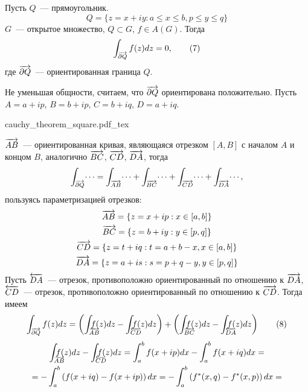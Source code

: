 \documentclass[main]{subfiles}
\begin{document}
\begin{theorem}\label{2:cauchy_square}
    Пусть $Q$~--- прямоугольник.
    \[Q = \{z = x + iy: a \le x \le b, p \le y \le q\}\]
    $G$~--- открытое множество, $Q \subset G$, $f \in A(G)$.
    Тогда
    \[\AnClOrInt[\AnClOrCurve[\partial Q]] f(z) dz = 0, \tag{7}\]
    где $\AnClOrCurve[\partial Q]$~--- ориентированная граница $Q$.
\end{theorem}
\begin{longProof}
    Не уменьшая общности, считаем, что $\AnClOrCurve[\partial Q]$ ориентирована положительно.
    Пусть $A = a + ip$, $B = b + ip$, $C = b + iq$, $D = a + iq$.
    \begin{center}
        {cauchy_theorem_square.pdf_tex}
    \end{center}
    $\AnClOrCurve[AB]$~--- ориентированная кривая, являющаяся отрезком $[A, B]$ с началом $A$ и концом $B$, аналогично $\AnClOrCurve[BC]$, $\AnClOrCurve[CD]$, $\AnClOrCurve[DA]$, тогда
    \[\AnClOrInt[\AnClOrCurve[\partial Q]] \dotsi = \AnClOrInt[\AnClOrCurve[AB]] \dotsi + \AnClOrInt[\AnClOrCurve[BC]] \dotsi + \AnClOrInt[\AnClOrCurve[CD]] \dotsi + \AnClOrInt[\AnClOrCurve[DA]] \dotsi,\]
    пользуясь параметризацией отрезков:
    \begin{gather*}
        \AnClOrCurve[AB] = \{z = x + ip: x \in [a,b]\} \\
        \AnClOrCurve[BC] = \{z = b + iy: y \in [p,q]\} \\
        \AnClOrCurve[CD] = \{z = t + iq: t = a + b - x, x \in [a,b]\}\\
        \AnClOrCurve[DA] = \{z = a + is: s = p + q - y, y \in [p,q]\}
    \end{gather*}
    Пусть $\ClOrCurve[DA]$~--- отрезок, противоположно ориентированный по отношению к $\AnClOrCurve[DA]$, $\ClOrCurve[CD]$~--- отрезок, противоположно ориентированный по отношению к $\AnClOrCurve[CD]$.
    Тогда имеем
    \[ \AnClOrInt[\AnClOrCurve[\partial Q]] f(z) dz = \left( \AnClOrInt[\mathrlap{\AnClOrCurve[AB]}] f(z) dz - \ClOrInt[\mathrlap{\ClOrCurve[CD]}] f(z) dz \right) + \left( \AnClOrInt[\mathrlap{\AnClOrCurve[BC]}] f(z) dz - \ClOrInt[\mathrlap{\ClOrCurve[DA]}] f(z) dz \right) \tag{8} \]
    \begin{multline*}
        \AnClOrInt[\mathrlap{\AnClOrCurve[AB]}] f(z) dz - \ClOrInt[\mathrlap{\ClOrCurve[CD]}] f(z) dz = \int_{a}^{b} f(x + ip) dx - \int_{a}^{b} f(x + iq) dx = \\
        = - \int_{a}^{b} \left(f(x + iq) - f(x + ip)\right) dx = - \int_{a}^{b} \left(f^*(x, q) - f^*(x, p)\right) dx = \\

\end{multline*}
\end{longProof}
\end{document}

